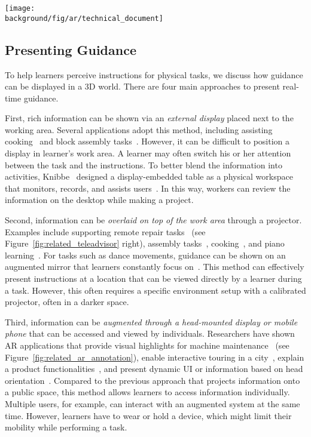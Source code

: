 \begin{figure*}[t!]
  \centering
  \texttt{[image: \\background/fig/ar/technical\_document]}
  \caption{Work by Mohr \ea{}~\cite{Mohr:2015:RTD:2702123.2702490} automatically analyzes a technical document and augments a machine with AR animation in 3D.}
  \label{fig:related_ar_annotation}
\end{figure*}

\subsection{Presenting Guidance}
To help learners perceive instructions for physical tasks, we discuss how guidance can be displayed in a 3D world. There are four main approaches to present real-time guidance.

First, rich information can be shown via an \emph{external display} placed next to the working area. Several applications adopt this method, including assisting cooking~\cite{Uriu:2012:PRM:2207676.2207695} and block assembly tasks~\cite{Gupta:2012ku,Wu:2016:ARI:2856400.2856416}. However, it can be difficult to position a display in learner's work area. A learner may often switch his or her attention between the task and the instructions. To better blend the information into activities, Knibbe~\ea{} designed a display-embedded table as a physical workspace that monitors, records, and assists users~\cite{Knibbe:2015:SMI:2817721.2817741}. In this way, workers can review the information on the desktop while making a project.

Second, information can be \emph{overlaid on top of the work area} through a projector. Examples include supporting remote repair tasks~\cite{Gurevich:2012ko} (see Figure~\ref{fig:related_teleadvisor} right), assembly tasks~\cite{Kirk:2006:CRG:1124772.1124951}, cooking~\cite{Ju:2001:CIC:634067.634227}, and piano learning~\cite{Xiao:2016:IEI:2858036.2858577}.
%
For tasks such as dance movements, guidance can be shown on an augmented mirror that learners constantly focus on~\cite{Anderson:2013:YEM:2501988.2502045}.
%
This method can effectively present instructions at a location that can be viewed directly by a learner during a task. However, this often requires a specific environment setup with a calibrated projector, often in a darker space.

Third, information can be \emph{augmented through a head-mounted display or mobile phone} that can be accessed and viewed by individuals. Researchers have shown AR applications that provide visual highlights for machine maintenance~\cite{Henderson:2011ff,Mohr:2015:RTD:2702123.2702490} (see Figure~\ref{fig:related_ar_annotation}), enable interactive touring in a city~\cite{Feiner1997}, explain a product functionalities~\cite{MagicLens}, and present dynamic UI or information based on head orientation~\cite{Zhang:2014:HHO:2659766.2659773}.
%
Compared to the previous approach that projects information onto a public space, this method allows learners to access information individually. Multiple users, for example, can interact with an augmented system at the same time. However, learners have to wear or hold a device, which might limit their mobility while performing a task.

